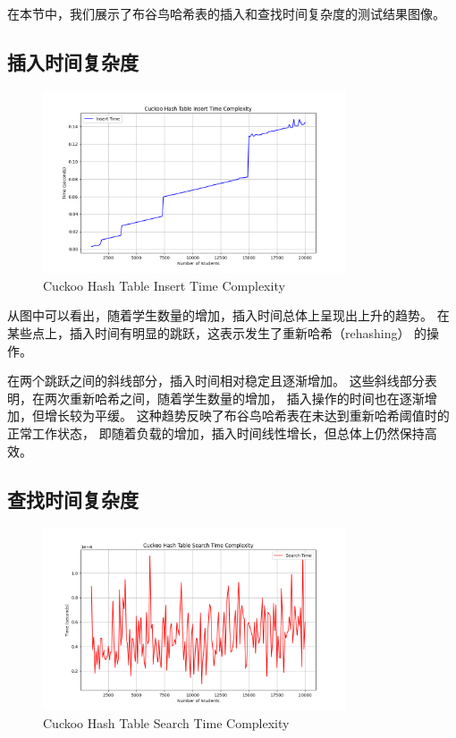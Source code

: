 \documentclass[UTF8]{ctexart}
\begin{document}
在本节中，我们展示了布谷鸟哈希表的插入和查找时间复杂度的测试结果图像。

\subsection{插入时间复杂度}
\begin{figure}[H]
    \centering
    \includegraphics[width=0.8\textwidth]{insert_times.png}
    \caption{Cuckoo Hash Table Insert Time Complexity}
    \label{fig:insert_times}
\end{figure}

从图中可以看出，随着学生数量的增加，插入时间总体上呈现出上升的趋势。
在某些点上，插入时间有明显的跳跃，这表示发生了重新哈希（rehashing）
的操作。

在两个跳跃之间的斜线部分，插入时间相对稳定且逐渐增加。
这些斜线部分表明，在两次重新哈希之间，随着学生数量的增加，
插入操作的时间也在逐渐增加，但增长较为平缓。
这种趋势反映了布谷鸟哈希表在未达到重新哈希阈值时的正常工作状态，
即随着负载的增加，插入时间线性增长，但总体上仍然保持高效。

\subsection{查找时间复杂度}
\begin{figure}[H]
    \centering
    \includegraphics[width=0.8\textwidth]{search_times.png}
    \caption{Cuckoo Hash Table Search Time Complexity}
    \label{fig:search_times}
\end{figure}
\end{document}

